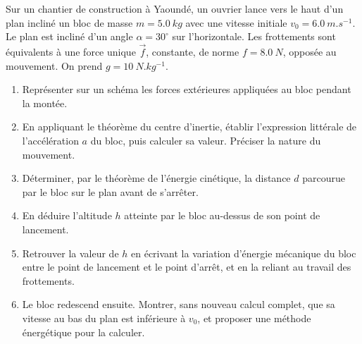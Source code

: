 \documentclass[11pt]{article}
\begin{document}
\begin{exercice}
Sur un chantier de construction à Yaoundé, un ouvrier lance vers le haut d'un plan incliné un bloc de masse $m = \SI{5,0}{kg}$ avec une vitesse initiale $v_0 = \SI{6,0}{m.s^{-1}}$. Le plan est incliné d'un angle $\alpha = 30^{\circ}$ sur l'horizontale. Les frottements sont équivalents à une force unique $\vec{f}$, constante, de norme $f = \SI{8,0}{N}$, opposée au mouvement. On prend $g = \SI{10}{N.kg^{-1}}$.
\begin{enumerate}
\item Représenter sur un schéma les forces extérieures appliquées au bloc pendant la montée.
\item En appliquant le théorème du centre d'inertie, établir l'expression littérale de l'accélération $a$ du bloc, puis calculer sa valeur. Préciser la nature du mouvement.
\item Déterminer, par le théorème de l'énergie cinétique, la distance $d$ parcourue par le bloc sur le plan avant de s'arrêter.
\item En déduire l'altitude $h$ atteinte par le bloc au-dessus de son point de lancement.
\item Retrouver la valeur de $h$ en écrivant la variation d'énergie mécanique du bloc entre le point de lancement et le point d'arrêt, et en la reliant au travail des frottements.
\item Le bloc redescend ensuite. Montrer, sans nouveau calcul complet, que sa vitesse au bas du plan est inférieure à $v_0$, et proposer une méthode énergétique pour la calculer.
\end{enumerate}
\end{exercice}
\end{document}
